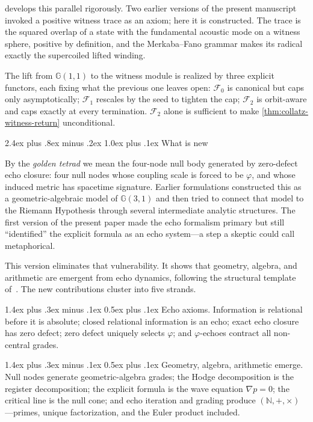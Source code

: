 \documentclass[11pt,a4paper]{article}
\makeatletter
\theoremstyle{plain}
\theoremstyle{definition}
\theoremstyle{remark}
\numberwithin{equation}{section}
\newcommand{\Cl}{\mathbb{G}}
\newcommand{\Nat}{\mathbb{N}}
\newcommand{\vp}{\varphi}
\renewcommand{\subsection}{%
  \@startsection{subsection}{2}{0pt}%
    {2.4ex plus .8ex minus .2ex}%
    {1.0ex plus .1ex}%
    {\normalfont\Large\bfseries\color{headingAccent}}%
}
\renewcommand{\paragraph}{%
  \@startsection{paragraph}{4}{0pt}%
    {1.4ex plus .3ex minus .1ex}%
    {0.5ex plus .1ex}%
    {\normalfont\normalsize\bfseries\color{headingAccent}}%
}
\makeatother
\begin{document}
 develops this parallel rigorously.  Two earlier
versions of the present manuscript invoked a positive witness trace
as an axiom; here it is constructed.  The trace is the squared
overlap of a state with the fundamental acoustic mode on a witness
sphere, positive by definition, and the Merkaba--Fano grammar makes
its radical exactly the supercoiled lifted winding.

The lift from $\Cl(1,1)$ to the witness module is realized by three
explicit functors, each fixing what the previous one leaves open:
$\mathcal{F}_0$ is canonical but caps only asymptotically;
$\mathcal{F}_1$ rescales by the seed to tighten the cap;
$\mathcal{F}_2$ is orbit-aware and caps exactly at every
termination.  $\mathcal{F}_2$ alone is sufficient to make
\cref{thm:collatz-witness-return} unconditional.

\subsection{What is new}

By the \emph{golden tetrad} we mean the four-node null body generated
by zero-defect echo closure: four null nodes whose coupling scale is
forced to be \(\vp\), and whose induced metric has spacetime signature.
Earlier formulations constructed this as a geometric-algebraic model of
\(\Cl(3,1)\) and then tried to connect that model to the Riemann
Hypothesis through several intermediate analytic structures.  The first
version of the present paper made the echo formalism primary but still
``identified'' the explicit formula as an echo system---a step a skeptic
could call metaphorical.

This version eliminates that vulnerability.  It shows that
geometry, algebra, and arithmetic are emergent from echo dynamics,
following the structural template of~\cite{burns2024}.  The new
contributions cluster into five strands.

\paragraph{Echo axioms.}  Information is relational before it is
absolute; closed relational information is an echo; exact echo
closure has zero defect; zero defect uniquely selects \(\vp\); and
\(\vp\)-echoes contract all non-central grades.

\paragraph{Geometry, algebra, arithmetic emerge.}  Null nodes
generate geometric-algebra grades; the Hodge decomposition is the
register decomposition; the explicit formula is the wave equation
\(\nabla p=0\); the critical line is the null cone; and echo
iteration and grading produce \((\Nat,+,\times)\)---primes, unique
factorization, and the Euler product included.
\end{document}
